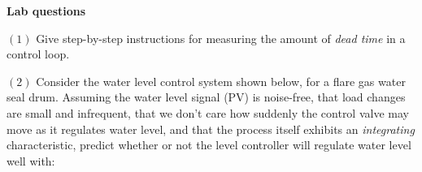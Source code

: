 \documentclass[12pt,a4paper]{article}
\begin{document}
\vfil \eject

\noindent
{\bf Lab questions}

\vskip 20pt

\item{$(1)$} Give step-by-step instructions for measuring the amount of {\it dead time} in a control loop.

\vskip 20pt

\item{$(2)$} Consider the water level control system shown below, for a flare gas water seal drum.  Assuming the water level signal (PV) is noise-free, that load changes are small and infrequent, that we don't care how suddenly the control valve may move as it regulates water level, and that the process itself exhibits an {\it integrating} characteristic, predict whether or not the level controller will regulate water level well with:
\end{document}
